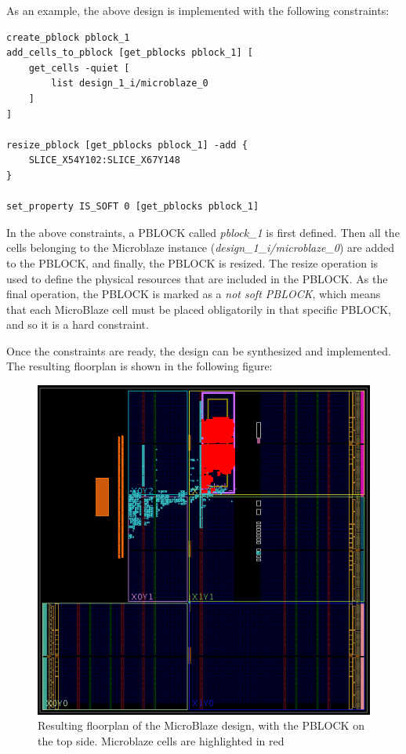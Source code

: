 As an example, the above design is implemented with the following constraints:\smallskip

\begin{lstlisting}[style=tcl]
create_pblock pblock_1
add_cells_to_pblock [get_pblocks pblock_1] [
    get_cells -quiet [
        list design_1_i/microblaze_0
    ]
]

resize_pblock [get_pblocks pblock_1] -add {
    SLICE_X54Y102:SLICE_X67Y148
}

set_property IS_SOFT 0 [get_pblocks pblock_1]
\end{lstlisting}

In the above constraints, a PBLOCK called \textit{pblock\_1} is first defined. Then all the cells belonging to the Microblaze instance (\textit{design\_1\_i/microblaze\_0}) are added to the PBLOCK, and finally, the PBLOCK is resized. The resize operation is used to define the physical resources that are included in the PBLOCK. As the final operation, the PBLOCK is marked as a \textit{not soft PBLOCK}, which means that each MicroBlaze cell must be placed obligatorily in that specific PBLOCK, and so it is a hard constraint.\bigskip

Once the constraints are ready, the design can be synthesized and implemented. The resulting floorplan is shown in the following figure:

\begin{figure}[H]
\centering
\includegraphics[width=0.8\linewidth]{images/chapter4/impl.png}
\caption{Resulting floorplan of the MicroBlaze design, with the PBLOCK on the top side. Microblaze cells are highlighted in red}
\end{figure}

